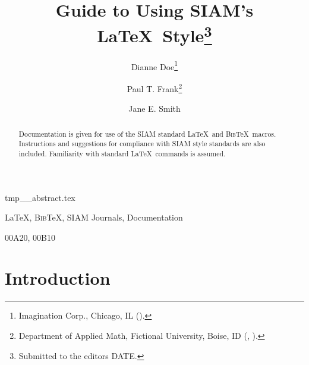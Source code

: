 \documentclass[final,onefignum,onetabnum]{siamart220329}
\title{Guide to Using SIAM's \LaTeX\ Style\thanks{Submitted to the editors DATE.
\funding{Funding information goes here.}}}
\author{Dianne Doe\thanks{Imagination Corp., Chicago, IL (\email{ddoe@imag.com}).}
\and Paul T. Frank\thanks{Department of Applied Math, Fictional University, Boise, ID (\email{ptfrank@fictional.edu}, \email{jesmith@fictional.edu}).}
\and Jane E. Smith\footnotemark[3]}
\newcommand{\BibTeX}{{\scshape Bib}\TeX\xspace}
\begin{document}
\maketitle

\begin{tcbverbatimwrite}{tmp_\jobname_abstract.tex}
\begin{abstract}
Documentation is given for use of the SIAM standard \LaTeX\ and \BibTeX\
macros.  Instructions and suggestions for compliance with SIAM style
standards are also included. Familiarity with standard \LaTeX\ commands is assumed.
\end{abstract}

\begin{keywords}
\LaTeX, \BibTeX, SIAM Journals, Documentation 
\end{keywords}

\begin{MSCcodes}
00A20, 00B10
\end{MSCcodes}
\end{tcbverbatimwrite}


\section{Introduction}
\label{sec:intro}
\end{document}
